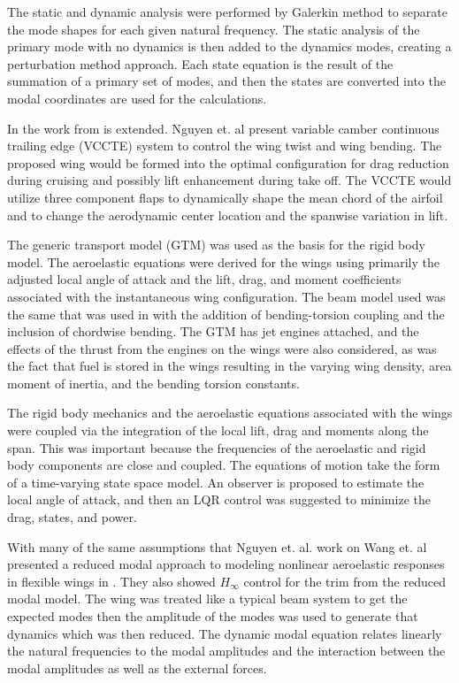 \documentclass[11pt]{ucthesis}
\begin{document}
The static and dynamic analysis were performed by Galerkin method to separate the mode shapes for each given natural frequency. The static analysis of the primary mode with no dynamics is then added to the dynamics modes, creating a perturbation method approach. Each state equation is the result of the summation of a primary set of modes, and then the states are converted into the modal coordinates are used for the calculations.

In \cite{nguyen2012aeroelastic} the work from \cite{nguyencoupled} is extended. Nguyen et. al present variable camber continuous trailing edge (VCCTE) system to control the wing twist and wing bending. The proposed wing would be formed into the optimal configuration for drag reduction during cruising and possibly lift enhancement during take off. The VCCTE would utilize three component flaps to dynamically shape the mean chord of the airfoil and to change the aerodynamic center location and the spanwise variation in lift.

The generic transport model (GTM) was used as the basis for the rigid body model. The aeroelastic equations were derived for the wings using primarily the adjusted local angle of attack and the lift, drag, and moment coefficients associated with the instantaneous wing configuration. The beam model used was the same that was used in \cite{nguyencoupled} with the addition of bending-torsion coupling and the inclusion of chordwise bending. The GTM has jet engines attached, and the effects of the thrust from the engines on the wings were also considered, as was the fact that fuel is stored in the wings resulting in the varying wing density, area moment of inertia, and the bending torsion constants.

The rigid body mechanics and the aeroelastic equations associated with the wings were coupled via the integration of the local lift, drag and moments along the span. This was important because the frequencies of the aeroelastic and rigid body components are close and coupled. The equations of motion take the form of a time-varying state space model. An observer is proposed to estimate the local angle of attack, and then an LQR control was suggested to minimize the drag, states, and power.

With many of the same assumptions that Nguyen et. al. work on Wang et. al presented a reduced modal approach to modeling nonlinear aeroelastic responses in flexible wings in \cite{wang2014nonlinear}. They also showed $H_{\infty}$ control for the trim from the reduced modal model. The wing was treated like a typical beam system to get the expected modes then the amplitude of the modes was used to generate that dynamics which was then reduced. The dynamic modal equation relates linearly the natural frequencies to the modal amplitudes and the interaction between the modal amplitudes as well as the external forces.
\end{document}
